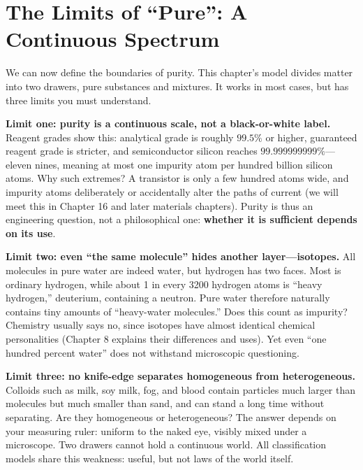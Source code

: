 \section{The Limits of ``Pure'': A Continuous Spectrum}

We can now define the boundaries of purity. This chapter's model divides matter into two drawers, pure substances and mixtures. It works in most cases, but has three limits you must understand.

\textbf{Limit one: purity is a continuous scale, not a black-or-white label.} Reagent grades show this: analytical grade is roughly $99.5\%$ or higher, guaranteed reagent grade is stricter, and semiconductor silicon reaches $99.999999999\%$---eleven nines, meaning at most one impurity atom per hundred billion silicon atoms. Why such extremes? A transistor is only a few hundred atoms wide, and impurity atoms deliberately or accidentally alter the paths of current (we will meet this in Chapter 16 and later materials chapters). Purity is thus an engineering question, not a philosophical one: \textbf{whether it is sufficient depends on its use}.

\textbf{Limit two: even ``the same molecule'' hides another layer---isotopes.} All molecules in pure water are indeed water, but hydrogen has two faces. Most is ordinary hydrogen, while about 1 in every 3200 hydrogen atoms is ``heavy hydrogen,'' deuterium, containing a neutron. Pure water therefore naturally contains tiny amounts of ``heavy-water molecules.'' Does this count as impurity? Chemistry usually says no, since isotopes have almost identical chemical personalities (Chapter 8 explains their differences and uses). Yet even ``one hundred percent water'' does not withstand microscopic questioning.

\textbf{Limit three: no knife-edge separates homogeneous from heterogeneous.} Colloids such as milk, soy milk, fog, and blood contain particles much larger than molecules but much smaller than sand, and can stand a long time without separating. Are they homogeneous or heterogeneous? The answer depends on your measuring ruler: uniform to the naked eye, visibly mixed under a microscope. Two drawers cannot hold a continuous world. All classification models share this weakness: useful, but not laws of the world itself.

